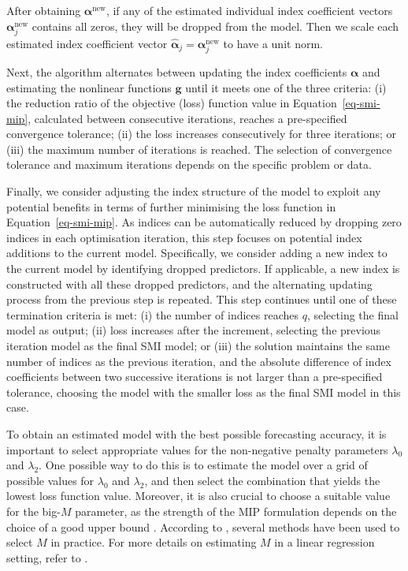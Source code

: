 \documentclass[
  11pt,
  a4paper,
]{article}
\begin{document}
After obtaining \(\bm{\alpha}^{\text{new}}\), if any of the estimated
individual index coefficient vectors \(\bm{\alpha}_{j}^{\text{new}}\)
contains all zeros, they will be dropped from the model. Then we scale
each estimated index coefficient vector
\(\hat{\bm{\alpha}}_{j} = \bm{\alpha}_{j}^{\text{new}}\) to have a unit
norm.

Next, the algorithm alternates between updating the index coefficients
\(\bm{\alpha}\) and estimating the nonlinear functions \(\bm{g}\) until
it meets one of the three criteria: (i) the reduction ratio of the
objective (loss) function value in Equation~\ref{eq-smi-mip}, calculated
between consecutive iterations, reaches a pre-specified convergence
tolerance; (ii) the loss increases consecutively for three iterations;
or (iii) the maximum number of iterations is reached. The selection of
convergence tolerance and maximum iterations depends on the specific
problem or data.

Finally, we consider adjusting the index structure of the model to
exploit any potential benefits in terms of further minimising the loss
function in Equation~\ref{eq-smi-mip}. As indices can be automatically
reduced by dropping zero indices in each optimisation iteration, this
step focuses on potential index additions to the current model.
Specifically, we consider adding a new index to the current model by
identifying dropped predictors. If applicable, a new index is
constructed with all these dropped predictors, and the alternating
updating process from the previous step is repeated. This step continues
until one of these termination criteria is met: (i) the number of
indices reaches \(q\), selecting the final model as output; (ii) loss
increases after the increment, selecting the previous iteration model as
the final SMI model; or (iii) the solution maintains the same number of
indices as the previous iteration, and the absolute difference of index
coefficients between two successive iterations is not larger than a
pre-specified tolerance, choosing the model with the smaller loss as the
final SMI model in this case.

To obtain an estimated model with the best possible forecasting
accuracy, it is important to select appropriate values for the
non-negative penalty parameters \(\lambda_{0}\) and \(\lambda_{2}\). One
possible way to do this is to estimate the model over a grid of possible
values for \(\lambda_{0}\) and \(\lambda_{2}\), and then select the
combination that yields the lowest loss function value. Moreover, it is
also crucial to choose a suitable value for the big-\(M\) parameter, as
the strength of the MIP formulation depends on the choice of a good
upper bound \autocite{Bertsimas2016}. According to
\textcite{Hazimeh2023}, several methods have been used to select \(M\)
in practice. For more details on estimating \(M\) in a linear regression
setting, refer to \textcite{Bertsimas2016}.
\end{document}

